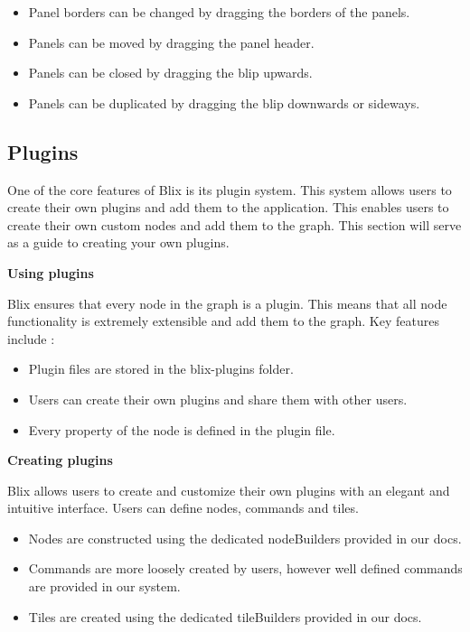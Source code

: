 \documentclass[11pt,a4paper]{article}
\begin{document}
\begin{itemize}
  \item[\textbullet] Panel borders can be changed by dragging the borders of the panels.
  \item[\textbullet] Panels can be moved by dragging the panel header.
  \item[\textbullet] Panels can be closed by dragging the blip upwards.
  \item[\textbullet] Panels can be duplicated by dragging the blip downwards or sideways.
\end{itemize}


\subsection*{Plugins}

One of the core features of Blix is its plugin system. This system allows users to create their own plugins and add them to the application. This enables users to create their own custom nodes and 
add them to the graph. This section will serve as a guide to creating your own plugins.

\textbf{Using plugins}

Blix ensures that every node in the graph is a plugin. This means that all node functionality is extremely extensible and add them to the graph. Key features include : 

\begin{itemize}
  \item[\textbullet] Plugin files are stored in the blix-plugins folder.
  \item[\textbullet] Users can create their own plugins and share them with other users.
  \item[\textbullet] Every property of the node is defined in the plugin file.
\end{itemize}

\textbf{Creating plugins}

Blix allows users to create and customize their own plugins with an elegant and intuitive interface. Users can define nodes, commands and tiles.

\begin{itemize}
  \item[\textbullet] Nodes are constructed using the dedicated nodeBuilders provided in our docs.
  \item[\textbullet] Commands are more loosely created by users, however well defined commands are provided in our system.
  \item[\textbullet] Tiles are created using the dedicated tileBuilders provided in our docs.
\end{itemize}
\end{document}
